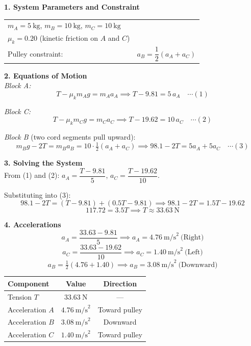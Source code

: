 \documentclass[12pt,a3paper]{article}
\begin{document}
\begin{enumerate}
\begin{tcolorbox}[enhanced,breakable,ansbox,colback=cG!4,colframe=cG,
  boxrule=0.8pt,arc=5pt,
  title={\textbf{Solution}},fonttitle=\bfseries\color{white},
  colbacktitle=cG]

\textbf{1. System Parameters and Constraint}\\[4pt]
\begin{center}
\begin{tabular}{ll}
  $m_A = 5\ \text{kg}$, \quad $m_B = 10\ \text{kg}$, \quad $m_C = 10\ \text{kg}$ \\[3pt]
  $\mu_k = 0.20$ (kinetic friction on $A$ and $C$) \\[3pt]
  Pulley constraint: & $a_B = \dfrac{1}{2}(a_A + a_C)$
\end{tabular}
\end{center}

\medskip
\textbf{2. Equations of Motion}\\[4pt]

\textit{Block A:}
\[
  T - \mu_k m_A g = m_A a_A
  \implies T - 9.81 = 5\,a_A \quad\cdots(1)
\]

\textit{Block C:}
\[
  T - \mu_k m_C g = m_C a_C
  \implies T - 19.62 = 10\,a_C \quad\cdots(2)
\]

\textit{Block B} (two cord segments pull upward):
\[
  m_B g - 2T = m_B a_B = 10\cdot\tfrac{1}{2}(a_A+a_C)
  \implies 98.1 - 2T = 5a_A + 5a_C \quad\cdots(3)
\]

\medskip
\textbf{3. Solving the System}\\[4pt]

From (1) and (2): $a_A = \dfrac{T-9.81}{5}$, \quad $a_C = \dfrac{T-19.62}{10}$.

Substituting into (3):
\[
  98.1 - 2T = (T - 9.81) + (0.5T - 9.81)
  \implies 98.1 - 2T = 1.5T - 19.62
\]
\[
  117.72 = 3.5T \implies \boxed{T \approx 33.63\ \text{N}}
\]

\medskip
\textbf{4. Accelerations}\\[4pt]

\[
  a_A = \frac{33.63-9.81}{5} \implies \boxed{a_A = 4.76\ \text{m/s}^2\ \text{(Right)}}
\]
\[
  a_C = \frac{33.63-19.62}{10} \implies \boxed{a_C = 1.40\ \text{m/s}^2\ \text{(Left)}}
\]
\[
  a_B = \tfrac{1}{2}(4.76+1.40) \implies \boxed{a_B = 3.08\ \text{m/s}^2\ \text{(Downward)}}
\]

\medskip
\begin{center}
\renewcommand{\arraystretch}{1.4}
\begin{tabular}{lcc}
  \hline
  \textbf{Component} & \textbf{Value} & \textbf{Direction} \\
  \hline
  Tension $T$       & $33.63\ \text{N}$ & --- \\
  Acceleration $A$  & $4.76\ \text{m/s}^2$ & Toward pulley \\
  Acceleration $B$  & $3.08\ \text{m/s}^2$ & Downward \\
  Acceleration $C$  & $1.40\ \text{m/s}^2$ & Toward pulley \\
  \hline
\end{tabular}
\end{center}


\end{tcolorbox}
\end{enumerate}
\end{document}
